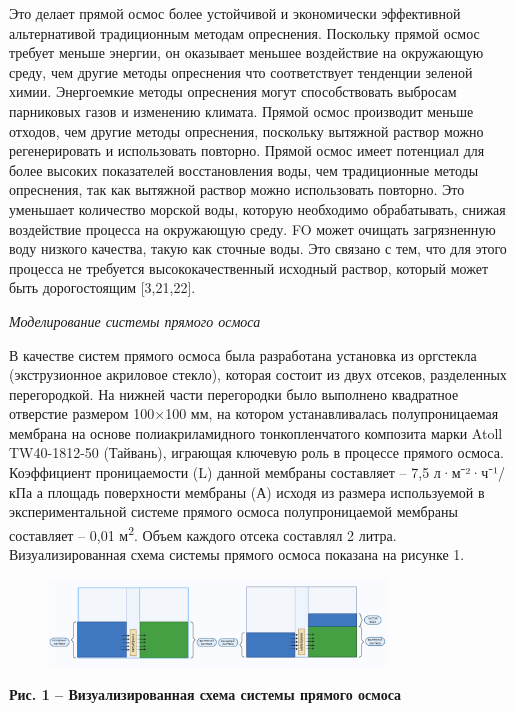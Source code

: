 Это делает прямой осмос более устойчивой и экономически эффективной
альтернативой традиционным методам опреснения. Поскольку прямой осмос
требует меньше энергии, он оказывает меньшее воздействие на окружающую
среду, чем другие методы опреснения что соответствует тенденции зеленой
химии. Энергоемкие методы опреснения могут способствовать выбросам
парниковых газов и изменению климата. Прямой осмос производит меньше
отходов, чем другие методы опреснения, поскольку вытяжной раствор можно
регенерировать и использовать повторно. Прямой осмос имеет потенциал для
более высоких показателей восстановления воды, чем традиционные методы
опреснения, так как вытяжной раствор можно использовать повторно. Это
уменьшает количество морской воды, которую необходимо обрабатывать,
снижая воздействие процесса на окружающую среду. FO может очищать
загрязненную воду низкого качества, такую как сточные воды. Это связано
с тем, что для этого процесса не требуется высококачественный исходный
раствор, который может быть дорогостоящим {[}3,21,22{]}.

\emph{Моделирование системы прямого осмоса}

В качестве систем прямого осмоса была разработана установка из оргстекла
(экструзионное акриловое стекло), которая состоит из двух отсеков,
разделенных перегородкой. На нижней части перегородки было выполнено
квадратное отверстие размером 100×100 мм, на котором устанавливалась
полупроницаемая мембрана на основе полиакриламидного тонкопленчатого
композита марки Atoll TW40-1812-50 (Тайвань), играющая ключевую роль в
процессе прямого осмоса. Коэффициент проницаемости (L) данной мембраны
составляет -- 7,5 л·м⁻²·ч⁻¹/кПа а площадь поверхности мембраны (А)
исходя из размера используемой в экспериментальной системе прямого
осмоса полупроницаемой мембраны составляет -- 0,01 м\textsuperscript{2}.
Объем каждого отсека составлял 2 литра. Визуализированная схема системы
прямого осмоса показана на рисунке 1.

\begin{figure}[H]
	\centering
	\includegraphics[width=0.8\textwidth]{media/chem/image26}
	\caption*{}
\end{figure}


{\bfseries Рис. 1 -- Визуализированная схема системы прямого осмоса}

